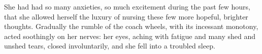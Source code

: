 She had had so many anxieties, so much excitement during the past few hours, that she allowed herself the luxury of nursing these few more hopeful, brighter thoughts. Gradually the rumble of the coach wheels, with its incessant monotony, acted soothingly on her nerves: her eyes, aching with fatigue and many shed and unshed tears, closed involuntarily, and she fell into a troubled sleep.
